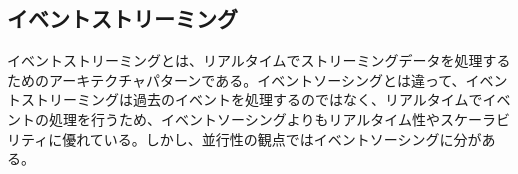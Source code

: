 \documentclass[../../../main]{subfiles}
\begin{document}
    \subsection{イベントストリーミング}\label{subsec:phraseology-event_streaming}

    イベントストリーミングとは、リアルタイムでストリーミングデータを処理するためのアーキテクチャパターンである。イベントソーシングとは違って、イベントストリーミングは過去のイベントを処理するのではなく、リアルタイムでイベントの処理を行うため、イベントソーシングよりもリアルタイム性やスケーラビリティに優れている。しかし、並行性の観点ではイベントソーシングに分がある。\cite{イベントストリーミング}
\end{document}
